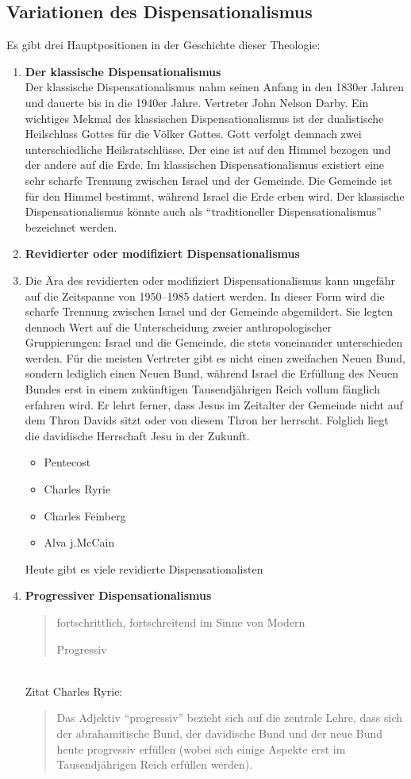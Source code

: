 \documentclass{../../inc/mybib}
\begin{document}
\subsection{Variationen des Dispensationalismus}
Es gibt drei Hauptpositionen in der Geschichte dieser Theologie:
\begin{enumerate}
    \item \textbf{Der klassische Dispensationalismus}\\
    Der klassische Dispensationalismus nahm seinen Anfang in den 1830er Jahren und dauerte bis in die 1940er Jahre. Vertreter John Nelson Darby. Ein wichtiges Mekmal des klassischen Dispensationalismus ist der dualistische Heilschluss Gottes für die Völker Gottes. Gott verfolgt demnach zwei unterschiedliche Heilsratschlüsse. Der eine ist auf den Himmel bezogen und der andere auf die Erde. Im klassischen Dispensationalismus existiert eine sehr scharfe Trennung zwischen Israel und der Gemeinde. Die Gemeinde ist für den Himmel bestimmt, während Israel die Erde erben wird. Der klassische Dispensationalismus könnte auch als \enquote{traditioneller Dispensationalismus} bezeichnet werden.
    \item \textbf{Revidierter oder modifiziert Dispensationalismus}\\
    \item Die Ära des revidierten oder modifiziert Dispensationalismus kann ungefähr auf die Zeitspanne von 1950--1985 datiert werden. In dieser Form wird die scharfe Trennung zwischen Israel und der Gemeinde abgemildert. Sie legten dennoch Wert auf die Unterscheidung zweier anthropologischer Gruppierungen: Israel und die Gemeinde, die stets voneinander unterschieden werden. Für die meisten Vertreter gibt es nicht einen zweifachen Neuen Bund, sondern lediglich einen Neuen Bund, während Israel die Erfüllung des Neuen Bundes erst in einem zukünftigen Tausendjährigen Reich vollum
    fänglich erfahren wird. Er lehrt ferner, dass Jesus im Zeitalter der Gemeinde nicht auf dem Thron Davids sitzt oder von diesem Thron her herrscht. Folglich liegt die davidische Herrschaft Jesu in der Zukunft.     
    \begin{itemize}    
        \item Pentecost        
        \item Charles Ryrie
        \item Charles Feinberg
        \item Alva j.McCain
    \end{itemize}    
    Heute gibt es viele revidierte Dispensationalisten
    \item \textbf{Progressiver Dispensationalismus} \blockquote[Progressiv]{fortschrittlich, fortschreitend im Sinne von Modern}\\
    Zitat Charles Ryrie: \blockquote{Das Adjektiv \enquote{progressiv} bezieht sich auf die zentrale Lehre, dass sich der abrahamitische Bund, der davidische Bund und der neue Bund heute progressiv erfüllen (wobei sich einige Aspekte erst im Tausendjährigen Reich erfüllen werden).} 
    

\end{enumerate}
\end{document}
